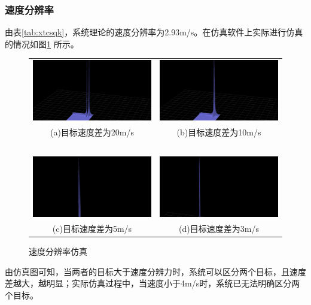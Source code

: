 \documentclass[12pt]{article}
\begin{document}
\subsubsection{速度分辨率}
由表\ref{tab:xtcsqk}，系统理论的速度分辨率为2.93m/s。在仿真软件上实际进行仿真的情况如图\ref{sdfblxh}
所示。
\begin{figure}[htbp]
\centering
\begin{tabular}{cc}
\includegraphics[width=.5\textwidth]{TIM20190916004903}&\includegraphics[width=.5\textwidth]{TIM20190916004815}\\
(a)目标速度差为20m/s&(b)目标速度差为10m/s\\
\ &\ \\
\includegraphics[width=.5\textwidth]{TIM20190916003254}&\includegraphics[width=.5\textwidth]{TIM20190916004656}\\
(c)目标速度差为5m/s&(d)目标速度差为3m/s\\
\end{tabular}
\caption{速度分辨率仿真}\label{sdfblxh}
\end{figure}\par
由仿真图可知，当两者的目标大于速度分辨力时，系统可以区分两个目标，且速度差越大，越明显；实际仿真过程中，当速度小于4m/s时，系统已无法明确区分两个目标。
\end{document}
